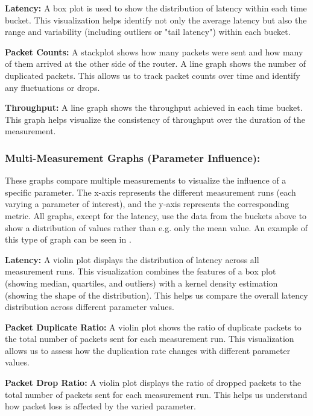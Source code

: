\noindent\textbf{Latency:} A box plot is used to show the distribution of latency within each time bucket.
This visualization helps identify not only the average latency but also the range and variability (including outliers or "tail latency") within each bucket.

\noindent\textbf{Packet Counts:} A stackplot shows how many packets were sent and how many of them arrived at the other side of the router.
A line graph shows the number of duplicated packets.
This allows us to track packet counts over time and identify any fluctuations or drops.

\noindent\textbf{Throughput:} A line graph shows the throughput achieved in each time bucket.
This graph helps visualize the consistency of throughput over the duration of the measurement.


\subsubsection{Multi-Measurement Graphs (Parameter Influence):}
These graphs compare multiple measurements to visualize the influence of a specific parameter.
The x-axis represents the different measurement runs (each varying a parameter of interest), and the y-axis represents the corresponding metric.
All graphs, except for the latency, use the data from the buckets above to show a distribution of values rather than e.g. only the mean value.
An example of this type of graph can be seen in .

\noindent\textbf{Latency:} A violin plot displays the distribution of latency across all measurement runs.
This visualization combines the features of a box plot (showing median, quartiles, and outliers) with a kernel density estimation (showing the shape of the distribution).
This helps us compare the overall latency distribution across different parameter values.

\noindent\textbf{Packet Duplicate Ratio:} A violin plot shows the ratio of duplicate packets to the total number of packets sent for each measurement run.
This visualization allows us to assess how the duplication rate changes with different parameter values.

\noindent\textbf{Packet Drop Ratio:} A violin plot displays the ratio of dropped packets to the total number of packets sent for each measurement run.
This helps us understand how packet loss is affected by the varied parameter.

